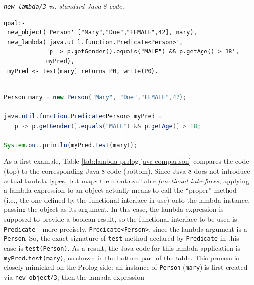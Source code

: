 \begin{table} %
\caption{\emph{\texttt{new\_lambda/3} vs. standard Java 8 code.}}
\label{tab:lambda-prolog-java-comparison}
\begin{lstlisting}[language=tuProlog,
	caption={}]
goal:-
 new_object('Person',["Mary","Doe","FEMALE",42], mary),
 new_lambda('java.util.function.Predicate<Person>',
            'p -> p.getGender().equals("MALE") && p.getAge() > 18',
            myPred),
 myPred <- test(mary) returns P0, write(P0).
	
\end{lstlisting}

\begin{lstlisting}[language=Java,
	caption={}]
Person mary = new Person("Mary", "Doe","FEMALE",42);

java.util.function.Predicate<Person> myPred =
   p -> p.getGender().equals("MALE") && p.getAge() > 18;

System.out.println(myPred.test(mary));	
\end{lstlisting}
\end{table}

As a first example, Table \ref{tab:lambda-prolog-java-comparison} compares the \tuprolog{} code (top) to the corresponding Java 8 code (bottom).
Since Java 8 does not introduce actual lambda types, but maps them onto suitable \textit{functional interfaces}, applying a lambda expression to an object actually means to call the ``proper'' method (i.e., the one defined by the functional interface in use) onto the lambda instance, passing the object as its argument. 
In this case, the lambda expression is supposed to provide a boolean result, so the functional interface to be used is \texttt{Predicate}---more precisely, \texttt{Predicate<Person>}, since the lambda argument is a \texttt{Person}.
So, the exact signature of \texttt{test} method declared by \texttt{Predicate} in this case is \texttt{test(Person)}. 
As a result, the Java code for this lambda application is \texttt{myPred.test(mary)}, as shown in the bottom part of the table.
%
This process is closely mimicked on the Prolog side: an instance of \texttt{Person} (\texttt{mary}) is first created via \texttt{new\_object/3}, then the lambda expression 

